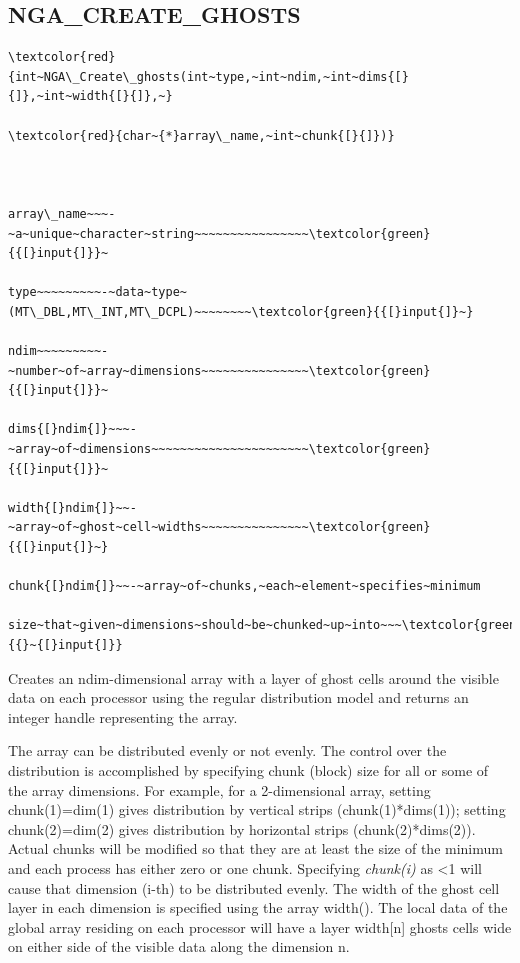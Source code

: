\subsection*{\label{sub:NGA_CREATE_GHOSTS}NGA\_CREATE\_GHOSTS}
\begin{verbatim}
\textcolor{red}{int~NGA\_Create\_ghosts(int~type,~int~ndim,~int~dims{[}{]},~int~width{[}{]},~}

\textcolor{red}{char~{*}array\_name,~int~chunk{[}{]})}



array\_name~~~-~a~unique~character~string~~~~~~~~~~~~~~~~\textcolor{green}{{[}input{]}}~

type~~~~~~~~~-~data~type~(MT\_DBL,MT\_INT,MT\_DCPL)~~~~~~~~\textcolor{green}{{[}input{]}~}

ndim~~~~~~~~~-~number~of~array~dimensions~~~~~~~~~~~~~~~\textcolor{green}{{[}input{]}}~

dims{[}ndim{]}~~~-~array~of~dimensions~~~~~~~~~~~~~~~~~~~~~~\textcolor{green}{{[}input{]}}~

width{[}ndim{]}~~-~array~of~ghost~cell~widths~~~~~~~~~~~~~~~\textcolor{green}{{[}input{]}~}

chunk{[}ndim{]}~~-~array~of~chunks,~each~element~specifies~minimum

size~that~given~dimensions~should~be~chunked~up~into~~~\textcolor{green}{{}~{[}input{]}}
\end{verbatim}
Creates an ndim-dimensional array with a layer of ghost cells around
the visible data on each processor using the regular distribution
model and returns an integer handle representing the array.

The array can be distributed evenly or not evenly. The control over
the distribution is accomplished by specifying chunk (block) size
for all or some of the array dimensions. For example, for a 2-dimensional
array, setting chunk(1)=dim(1) gives distribution by vertical strips
(chunk(1){*}dims(1)); setting chunk(2)=dim(2) gives distribution by
horizontal strips (chunk(2){*}dims(2)). Actual chunks will be modified
so that they are at least the size of the minimum and each process
has either zero or one chunk. Specifying \emph{chunk(i)} as <1 will
cause that dimension (i-th) to be distributed evenly. The width of
the ghost cell layer in each dimension is specified using the array
width(). The local data of the global array residing on each processor
will have a layer width{[}n{]} ghosts cells wide on either side of
the visible data along the dimension n.

